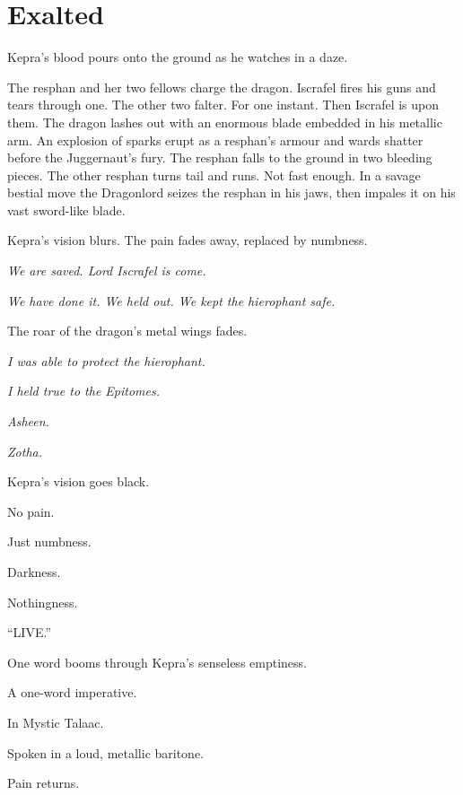 \documentclass
  [a4paper,
   12pt,
   oneside
  ]%
  {article}
\newcommand{\sectionbreak}{\bigskip\noindent}
\begin{document}
\section{Exalted}
Kepra’s blood pours onto the ground as he watches in a daze.

The resphan and her two fellows charge the dragon. 
Iscrafel fires his guns and tears through one. 
The other two falter.
For one instant. 
Then Iscrafel is upon them. 
The dragon lashes out with an enormous blade embedded in his metallic arm. 
An explosion of sparks erupt as a resphan’s armour and wards shatter before the Juggernaut’s fury. 
The resphan falls to the ground in two bleeding pieces. 
The other resphan turns tail and runs. 
Not fast enough. 
In a savage bestial move the Dragonlord seizes the resphan in his jaws, then impales it on his vast sword-like blade. 

Kepra’s vision blurs. 
The pain fades away, replaced by numbness.

\emph{We are saved. Lord Iscrafel is come.}

\emph{We have done it. We held out. We kept the hierophant safe.}

The roar of the dragon’s metal wings fades. 

\emph{I was able to protect the hierophant.}

\emph{I held true to the Epitomes.}

\emph{Asheen.}

\emph{Zotha.}

Kepra’s vision goes black. 

No pain. 

Just numbness. 

Darkness.

Nothingness.



\sectionbreak
{\Large{``{LIVE.}''}}

\sectionbreak
One word booms through Kepra’s senseless emptiness. 

A one-word imperative.

In Mystic Talaac.

Spoken in a loud, metallic baritone. 

Pain returns. 
\end{document}
